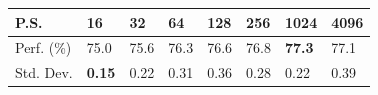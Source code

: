 \begin{tabular}{y{12mm}|x{8mm}x{8mm}x{8mm}x{8mm}x{8mm}x{8mm}x{8mm}}
\toprule
P.S. &16 &32 &64 &128 &256 &1024 &4096 \\\midrule
Perf. (\%) &75.0 &75.6 &76.3 &76.6 &76.8 &\textbf{77.3} &77.1 \\
Std. Dev. &\textbf{0.15} &0.22 &0.31 &0.36 &0.28 &0.22 &0.39 \\
\bottomrule
\end{tabular}